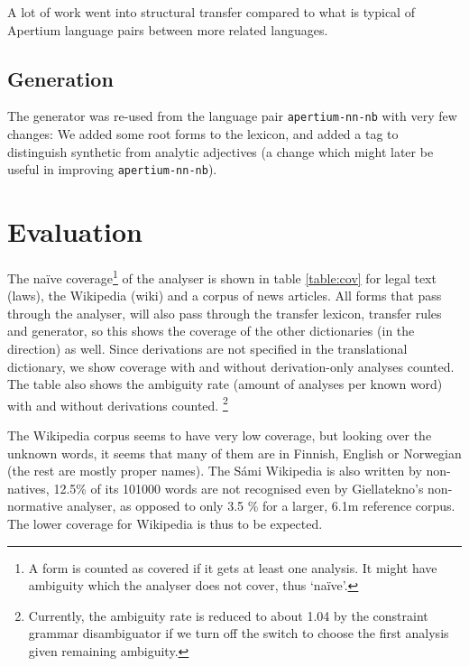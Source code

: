 A lot of work went into structural transfer compared to what is
typical of Apertium language pairs between more related languages.

\subsection{Generation}
The generator was re-used from the language pair
\texttt{apertium-nn-nb} with very few changes: We added some root
forms to the lexicon, and added a tag to distinguish synthetic from analytic
adjectives (a change which might later be useful in improving
\texttt{apertium-nn-nb}).

\section{Evaluation}
\label{sec:eval}
The na\"{i}ve coverage\footnote{A form is counted as covered if it
  gets at least one analysis. It might have ambiguity which the
  analyser does not cover, thus `na\"{i}ve'.} of the analyser is shown
in table \ref{table:cov} for legal text (laws), the \sme{} Wikipedia
(wiki) and a corpus of \sme{} news articles. All forms that pass
through the analyser, will also pass through the transfer lexicon,
transfer rules and generator, so this shows the coverage of the other
dictionaries (in the \smenob{} direction) as well. Since derivations
are not specified in the translational dictionary, we show coverage
with and without derivation-only analyses counted. The table also
shows the ambiguity rate (amount of analyses per known word) with and
without derivations counted. \footnote{Currently, the ambiguity rate
  is reduced to about 1.04 by the constraint grammar disambiguator if
  we turn off the switch to choose the first analysis given remaining
  ambiguity.}


The Wikipedia corpus seems to have very low coverage, but looking over
the unknown words, it seems that many of them are in Finnish, English
or Norwegian (the rest are mostly proper names). The S\'{a}mi Wikipedia
is also written by non-natives, 12.5\% of its 101000 words are not recognised
even by Giellatekno's non-normative analyser, as opposed to only 3.5 \% for
a larger, 6.1m reference corpus. The lower coverage for Wikipedia is thus to
be expected.



